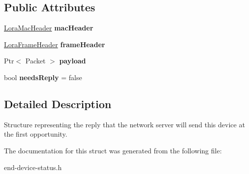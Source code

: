 \subsection*{Public Attributes}
\begin{DoxyCompactItemize}
\item 
\mbox{\label{structns3_1_1lorawan_1_1EndDeviceStatus_1_1Reply_a1babc172d726a50749ed47fc4ccf0b30}} 
\hyperlink{classns3_1_1lorawan_1_1LoraMacHeader}{Lora\+Mac\+Header} {\bfseries mac\+Header}
\item 
\mbox{\label{structns3_1_1lorawan_1_1EndDeviceStatus_1_1Reply_aee291be60f605ec91c73d182e834cec8}} 
\hyperlink{classns3_1_1lorawan_1_1LoraFrameHeader}{Lora\+Frame\+Header} {\bfseries frame\+Header}
\item 
\mbox{\label{structns3_1_1lorawan_1_1EndDeviceStatus_1_1Reply_aba65e6bc7e34636187606a8931770f2b}} 
Ptr$<$ Packet $>$ {\bfseries payload}
\item 
\mbox{\label{structns3_1_1lorawan_1_1EndDeviceStatus_1_1Reply_a9cb43a6e730750ab3bbefe5ca2442772}} 
bool {\bfseries needs\+Reply} = false
\end{DoxyCompactItemize}


\subsection{Detailed Description}
Structure representing the reply that the network server will send this device at the first opportunity. 

The documentation for this struct was generated from the following file\+:\begin{DoxyCompactItemize}
\item 
end-\/device-\/status.\+h\end{DoxyCompactItemize}
